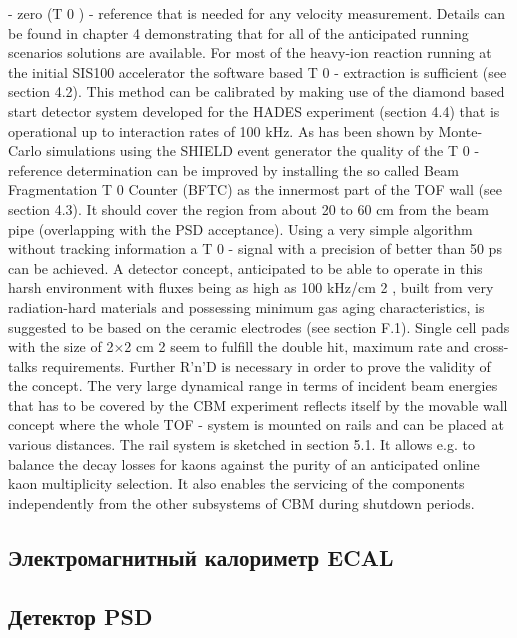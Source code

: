 - zero (T 0 ) - reference that is needed for any velocity measurement. Details can be found in chapter 4
demonstrating that for all of the anticipated running scenarios solutions are available. For most of the
heavy-ion reaction running at the initial SIS100 accelerator the software based T 0 - extraction is sufficient
(see section 4.2). This method can be calibrated by making use of the diamond based start detector
system developed for the HADES experiment (section 4.4) that is operational up to interaction rates of
100 kHz.
As has been shown by Monte-Carlo simulations using the SHIELD event generator the quality of the T 0
- reference determination can be improved by installing the so called Beam Fragmentation T 0 Counter
(BFTC) as the innermost part of the TOF wall (see section 4.3). It should cover the region from about
20 to 60 cm from the beam pipe (overlapping with the PSD acceptance). Using a very simple algorithm
without tracking information a T 0 - signal with a precision of better than 50 ps can be achieved. A detector
concept, anticipated to be able to operate in this harsh environment with fluxes being as high as 100
kHz/cm 2 , built from very radiation-hard materials and possessing minimum gas aging characteristics, is
suggested to be based on the ceramic electrodes (see section F.1). Single cell pads with the size of 2$\times$2
cm 2 seem to fulfill the double hit, maximum rate and cross-talks requirements. Further R'n'D is necessary
in order to prove the validity of the concept.
The very large dynamical range in terms of incident beam energies that has to be covered by the CBM
experiment reflects itself by the movable wall concept where the whole TOF - system is mounted on rails
and can be placed at various distances. The rail system is sketched in section 5.1. It allows e.g. to
balance the decay losses for kaons against the purity of an anticipated online kaon multiplicity selection.
It also enables the servicing of the components independently from the other subsystems of CBM during
shutdown periods.

\subsection{Электромагнитный калориметр ECAL}\label{sec:secECAL}

\subsection{Детектор PSD}\label{sec:secPSD}

